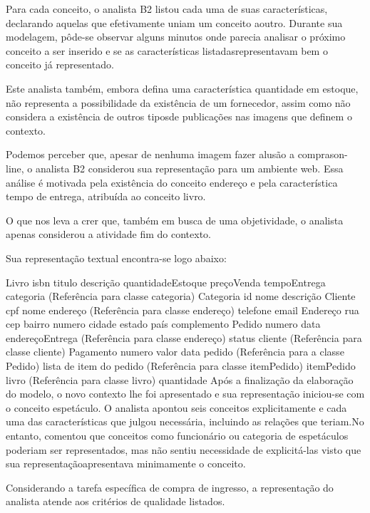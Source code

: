 Para cada conceito, o analista B2 listou cada uma de suas características, declarando aquelas que efetivamente uniam um conceito aoutro. Durante sua modelagem, pôde-se observar alguns minutos onde parecia analisar o próximo conceito a ser inserido e se as características listadasrepresentavam bem o conceito já representado.

Este analista também, embora defina uma característica quantidade em estoque, não representa a possibilidade da existência de um fornecedor, assim como não considera a existência de outros tiposde publicações nas imagens que definem o contexto.

Podemos perceber que, apesar de nenhuma imagem fazer alusão a comprason-line, o analista B2 considerou sua representação para um ambiente web. Essa análise é motivada pela existência do conceito endereço e pela característica tempo de entrega, atribuída ao conceito livro.

O que nos leva a crer que, também em busca de uma objetividade, o analista apenas considerou a atividade fim do contexto.

Sua representação textual encontra-se logo abaixo:

Livro
isbn
titulo
descrição
quantidadeEstoque
preçoVenda
tempoEntrega
categoria (Referência para classe categoria)
Categoria
id
nome
descrição
Cliente
cpf
nome
endereço (Referência para classe endereço)
telefone
email
Endereço
rua
cep
bairro
numero
cidade
estado
país
complemento
Pedido
numero
data
endereçoEntrega (Referência para classe endereço)
status
cliente (Referência para classe cliente)
Pagamento
numero
valor
data
pedido (Referência para a classe Pedido)
lista de item do pedido (Referência para classe itemPedido)
itemPedido
livro (Referência para classe livro)
quantidade
Após a finalização da elaboração do modelo, o novo contexto lhe foi apresentado e sua representação iniciou-se com o conceito espetáculo. O analista apontou seis conceitos explicitamente e cada uma das características que julgou necessária, incluindo as relações que teriam.No entanto, comentou que conceitos como funcionário ou categoria de espetáculos poderiam ser representados, mas não sentiu necessidade de explicitá-las visto que sua representaçãoapresentava minimamente o conceito. 

Considerando a tarefa específica de compra de ingresso, a representação do analista atende aos critérios de qualidade listados.

